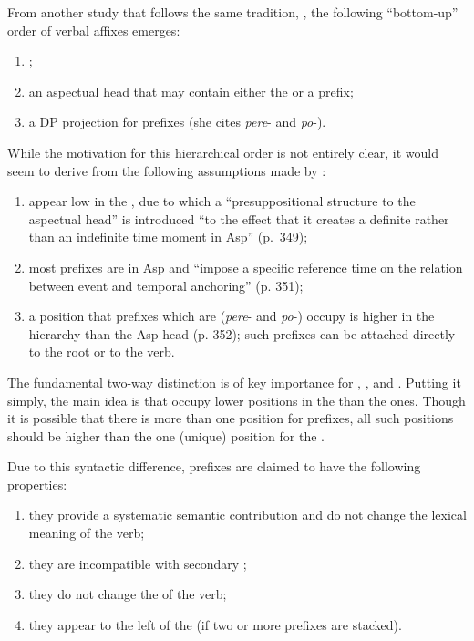 From another study that follows the same tradition, \citealt{Ramchand:04}, the following ``bottom-up'' order of verbal affixes emerges:

\begin{enumerate}
\item {};
\item an aspectual head that may contain either the  or a  prefix;
\item a DP projection for   prefixes (she cites \textit{pere}- and \textit{po}-). 
\end{enumerate}
While the motivation for this hierarchical order is not entirely clear, it would seem to derive from the following assumptions made by \citet{Ramchand:04}: 
\begin{enumerate}
\item {} appear low in the , due to which a ``presuppositional structure to the aspectual head'' is introduced ``to the effect that it creates a definite rather than an indefinite time moment in Asp'' (p.~349);
\item most  prefixes are in Asp and ``impose a specific reference time on the relation between event and temporal anchoring'' (p. 351);
\item a position that  prefixes which are  (\textit{pere}- and  \textit{po}-) occupy is higher in the hierarchy than the Asp head (p. 352); such prefixes can be attached directly to the root or to the  verb.
\end{enumerate}
The fundamental two-way distinction is of key importance for \citet{Romanova:04}, \citet{Svenonius:04b}, and \citet{Ramchand:04}. Putting it simply, the main idea is that  occupy lower positions in the  than the  ones. Though it is possible that there is more than one position for  prefixes, all such positions should be higher than the one (unique) position for the . 

Due to this syntactic difference,  prefixes are claimed to have the following properties:
\begin{enumerate}
\item they provide a systematic semantic contribution and do not change the lexical meaning of the verb;
\item they are incompatible with secondary ;
\item they do not change the  of the verb;
\item they appear to the left of the  (if two or more prefixes are stacked). 
\end{enumerate}

